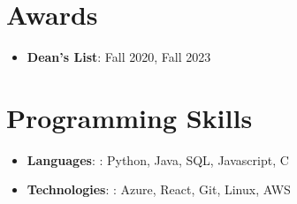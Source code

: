 \documentclass[letterpaper,11pt]{article}
\newcommand{\resumeItem}[2]{
  \item\small{
    \textbf{#1}{: #2 \vspace{-0pt}}
  }
}
\newcommand{\resumeItemListStart}{\begin{itemize}}
\newcommand{\resumeItemListEnd}{\end{itemize}\vspace{-0pt}}
\begin{document}
\section{Awards}
 \resumeItemListStart
 \resumeItem{Dean's List}
   {Fall 2020, Fall 2023}
 \resumeItemListEnd
\section{Programming Skills}
 \resumeItemListStart
  \resumeItem{Languages}{: Python, Java, SQL, Javascript, C}
  \resumeItem{Technologies}{: Azure, React, Git, Linux, AWS}
 \resumeItemListEnd


\end{document}
